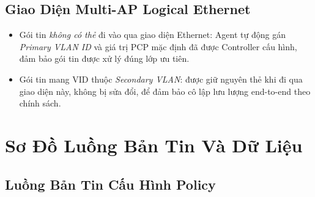 \subsection{Giao Diện Multi-AP Logical Ethernet}

\begin{itemize}
	\item Gói tin \textit{không có thẻ} đi vào qua giao diện Ethernet: Agent tự động
	gán \textit{Primary VLAN ID} và giá trị PCP mặc định đã được Controller cấu
	hình, đảm bảo gói tin được xử lý đúng lớp ưu tiên.
	\item Gói tin mang VID thuộc \textit{Secondary VLAN}: được giữ nguyên thẻ khi đi
	qua giao diện này, không bị sửa đổi, để đảm bảo cô lập lưu lượng end-to-end
	theo chính sách.
\end{itemize}


\section{Sơ Đồ Luồng Bản Tin Và Dữ Liệu}

\subsection{Luồng Bản Tin Cấu Hình Policy}


